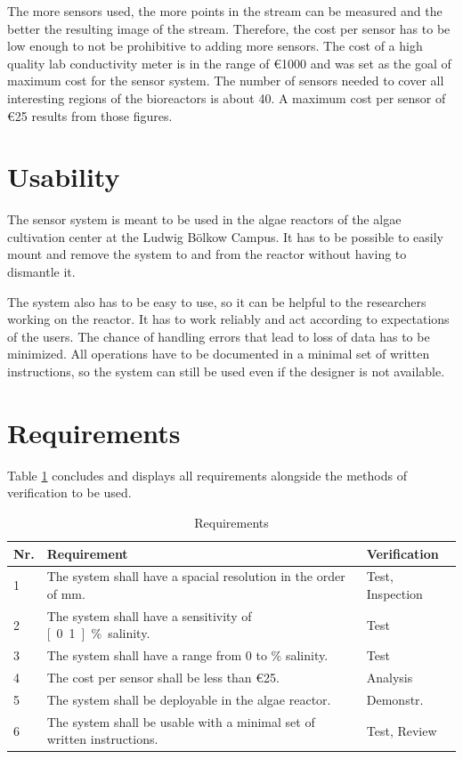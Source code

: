 The more sensors used, the more points in the stream can be measured and the better the resulting image of the stream. Therefore, the cost per sensor has to be low enough to not be prohibitive to adding more sensors.
The cost of a high quality lab conductivity meter is in the range of \euro{1000} and was set as the goal of maximum cost for the sensor system. The number of sensors needed to cover all interesting regions of the bioreactors is about 40.
A maximum cost per sensor of \euro{25} results from those figures.

\section{Usability}

The sensor system is meant to be used in the algae reactors of the algae cultivation center at the Ludwig Bölkow Campus. It has to be possible to easily mount and remove the system to and from the reactor without having to dismantle it.

The system also has to be easy to use, so it can be helpful to the researchers working on the reactor. It has to work reliably and act according to expectations of the users. The chance of handling errors that lead to loss of data has to be minimized. All operations have to be documented in a minimal set of written instructions, so the system can still be used even if the designer is not available.

\section{Requirements}

Table \ref{tab:req} concludes and displays all requirements alongside the methods of verification to be used.

\begin{table}[H]
    \centering

    \caption[Requirements]{Requirements}
    \label{tab:req}
    \begin{tabular}{lp{}l}
        	\toprule
        	Nr. & Requirement & Verification \tabularnewline
        	\midrule
		1 & The system shall have a spacial resolution in the order of \unit[10]{mm}. & Test, Inspection \tabularnewline
		2 & The system shall have a sensitivity of  \unit[0.1]{\%} salinity.  & Test \tabularnewline
		3 & The system shall have a range from 0 to \unit[5]{\%} salinity.  & Test \tabularnewline
		4 & The cost per sensor shall be less than \euro{25}.  & Analysis \tabularnewline
		5 & The system shall be deployable in the algae reactor. & Demonstr. \tabularnewline
		6 & The system shall be usable with a minimal set of written instructions. & Test, Review \tabularnewline
        \bottomrule
    \end{tabular}
\end{table}